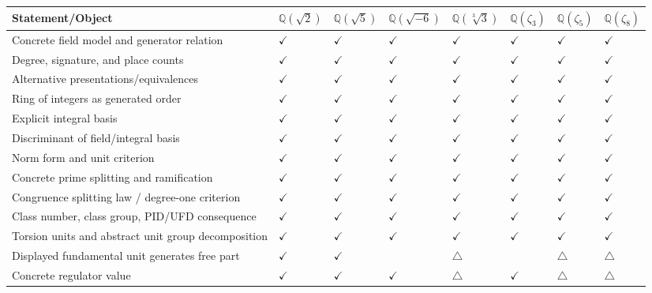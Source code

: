 \documentclass[UTF8,a4paper,11pt,fontset=fandol]{ctexart}
\renewcommand{\arraystretch}{1.18}
\theoremstyle{definition}
\newcommand{\gok}{\textcolor{green!55!black}{\ensuremath{\checkmark}}}
\newcommand{\yok}{\textcolor{yellow!45!black}{\ensuremath{\checkmark}}}
\newcommand{\warnsym}{\textcolor{orange!85!black}{\ensuremath{\triangle}}}
\newcommand{\na}{\textemdash}
\newcommand{\fieldhead}[1]{\scriptsize #1}
\begin{document}
\begin{landscape}
\begin{table}[p]
\centering
\small
\setlength{\tabcolsep}{3pt}
\renewcommand{\arraystretch}{1.13}
\begin{tabular}{>{\raggedright\arraybackslash}p{8.1cm}
>{\centering\arraybackslash}m{1.68cm}
>{\centering\arraybackslash}m{1.68cm}
>{\centering\arraybackslash}m{1.68cm}
>{\centering\arraybackslash}m{1.68cm}
>{\centering\arraybackslash}m{1.68cm}
>{\centering\arraybackslash}m{1.68cm}
>{\centering\arraybackslash}m{1.68cm}}
\toprule
Statement/Object &
\fieldhead{\(\mathbb Q(\sqrt2)\)} &
\fieldhead{\(\mathbb Q(\sqrt5)\)} &
\fieldhead{\(\mathbb Q(\sqrt{-6})\)} &
\fieldhead{\(\mathbb Q(\sqrt[3]{3})\)} &
\fieldhead{\(\mathbb Q(\zeta_3)\)} &
\fieldhead{\(\mathbb Q(\zeta_5)\)} &
\fieldhead{\(\mathbb Q(\zeta_8)\)} \\
\midrule
Concrete field model and generator relation & \gok & \gok & \gok & \gok & \gok & \gok & \gok \\
Degree, signature, and place counts & \yok & \yok & \gok & \yok & \gok & \gok & \gok \\
Alternative presentations/equivalences & \yok & \yok & \gok & \gok & \yok & \yok & \yok \\
Ring of integers as generated order & \yok & \yok & \yok & \yok & \gok & \gok & \gok \\
Explicit integral basis & \gok & \yok & \yok & \yok & \gok & \gok & \gok \\
Discriminant of field/integral basis & \gok & \yok & \yok & \yok & \gok & \gok & \gok \\
Norm form and unit criterion & \gok & \gok & \gok & \yok & \gok & \yok & \yok \\
Concrete prime splitting and ramification & \yok & \yok & \yok & \yok & \yok & \yok & \yok \\
Congruence splitting law / degree-one criterion & \yok & \yok & \yok & \yok & \yok & \yok & \yok \\
Class number, class group, PID/UFD consequence & \gok & \yok & \yok & \yok & \gok & \yok & \yok \\
Torsion units and abstract unit group decomposition & \yok & \yok & \gok & \yok & \gok & \yok & \yok \\
Displayed fundamental unit generates free part & \yok & \yok & \na & \warnsym & \na & \warnsym & \warnsym \\
Concrete regulator value & \yok & \yok & \gok & \warnsym & \gok & \warnsym & \warnsym \\

\end{tabular}
\end{table}
\end{landscape}
\end{document}
